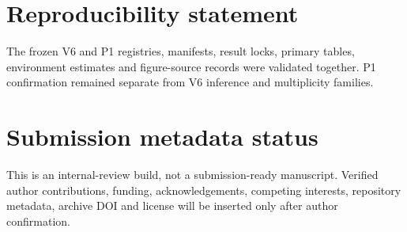 \documentclass[10pt,twocolumn]{article}
\begin{document}
\section*{Reproducibility statement}
The frozen V6 and P1 registries, manifests, result locks, primary tables, environment estimates and figure-source records were validated together. P1 confirmation remained separate from V6 inference and multiplicity families.

\section*{Submission metadata status}
This is an internal-review build, not a submission-ready manuscript. Verified author contributions, funding, acknowledgements, competing interests, repository metadata, archive DOI and license will be inserted only after author confirmation.
\small


\end{document}
